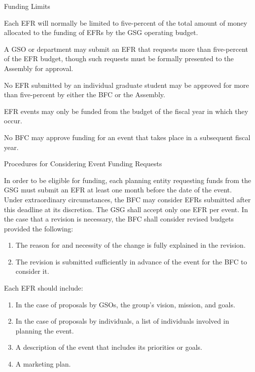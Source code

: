 \begin{bylaws-number}
  \item Funding Limits
\begin{bylaws-number}
  \item Each EFR will normally be limited to five-percent of the total amount of money allocated to the funding of EFRs by the GSG operating budget.
  \item A GSO or department may submit an EFR that requests more than five-percent of the EFR budget, though such requests must be formally presented to the Assembly for approval.
  \item No EFR submitted by an individual graduate student may be approved for more than five-percent by either the BFC or the Assembly.
  \item EFR events may only be funded from the budget of the fiscal year in which they occur.
  \item No BFC may approve funding for an event that takes place in a subsequent fiscal year.
\end{bylaws-number}
  \item Procedures for Considering Event Funding Requests
\begin{bylaws-number}
  \item In order to be eligible for funding, each planning entity requesting funds from the GSG must submit an EFR at least one month before the date of the event. Under extraordinary circumstances, the BFC may consider EFRs submitted after this deadline at its discretion. The GSG shall accept only one EFR per event. In the case that a revision is necessary, the BFC shall consider revised budgets provided the following:
\begin{enumerate}[i]
  \item The reason for and necessity of the change is fully explained in the revision.
  \item The revision is submitted sufficiently in advance of the event for the BFC to consider it.
\end{enumerate}
  \item Each EFR should include:
\begin{enumerate}[i]
  \item In the case of proposals by GSOs, the group’s vision, mission, and goals.
  \item In the case of proposals by individuals, a list of individuals involved in planning the event.
  \item A description of the event that includes its priorities or goals.
  \item A marketing plan.

\end{enumerate}
\end{bylaws-number}
\end{bylaws-number}
